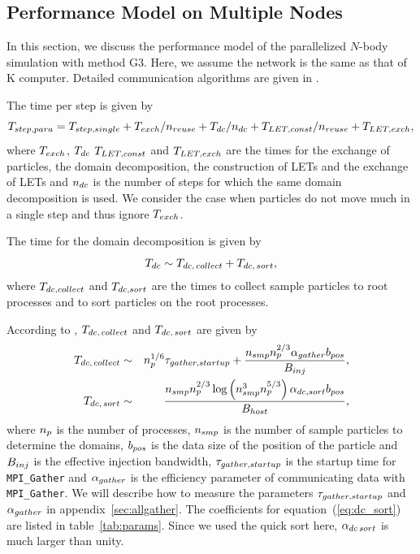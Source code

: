 \documentclass[dvipdfmx]{pasj01}
\begin{document}
\subsection{Performance Model on Multiple Nodes}
\label{sec:perf_model_para}

In this section, we discuss the performance model of the parallelized
$N$-body simulation with method G3. Here, we assume the network is the
same as that of K computer. Detailed communication algorithms are
given in \citet{Iwasawaetal2016}.

The time per step is given by
\begin{equation}
  T_{\rm step, para} = T_{\rm step, single} + T_{\rm exch}/n_{\rm reuse} + T_{\rm dc}/n_{\rm dc} + T_{\rm LET, const}/n_{\rm reuse} + T_{\rm LET, exch},
\end{equation}
where $T_{\rm exch}$, $T_{\rm dc}$ $T_{\rm LET, const}$ and $T_{\rm
  LET, exch}$ are the times for the exchange of particles, the domain
decomposition, the construction of LETs and the exchange of LETs and
$n_{\rm dc}$ is the number of steps for which the same domain
decomposition is used. We consider the case when particles do not move
much in a single step and thus ignore $T_{\rm exch}$.

The time for the domain decomposition is given by
\begin{equation}
  T_{\rm dc} \sim T_{\rm dc,\, collect} + T_{\rm dc,\, sort},
\end{equation}
where $T_{\rm dc, collect}$ and $T_{\rm dc, sort}$ are the times to
collect sample particles to root processes and to sort particles on
the root processes.

According to \citet{Iwasawaetal2016}, $T_{\rm dc,\, collect}$ and
$T_{\rm dc,\, sort}$ are given by
\begin{eqnarray}
    T_{\rm dc,\, collect} &\sim& n^{1/6}_{\rm p} \tau_{\rm gather, startup} + \frac{n_{\rm smp} n^{2/3}_{\rm p} \alpha_{\rm gather} b_{\rm pos}}{B_{\rm inj}}, \label{eq:dc_collect}  \\
  T_{\rm dc,\, sort} &\sim& \frac{n_{\rm smp} n^{2/3}_{\rm p} \log \left( n^3_{\rm smp} n^{5/3}_{\rm p} \right) \alpha_{\rm dc, sort} b_{\rm pos}}{B_{\rm host}}, \label{eq:dc_sort}
\end{eqnarray}
where $n_{\rm p}$ is the number of processes, $n_{\rm smp}$ is the
number of sample particles to determine the domains, $b_{\rm pos}$ is
the data size of the position of the particle and $B_{\rm inj}$ is the
effective injection bandwidth, $\tau_{\rm gather, startup}$ is the
startup time for {\tt MPI\_Gather} and $\alpha_{\rm gather}$ is the
efficiency parameter of communicating data with {\tt MPI\_Gather}. We
will describe how to measure the parameters $\tau_{\rm gather,
  startup}$ and $\alpha_{\rm gather}$ in
appendix~\ref{sec:allgather}. The coefficients for
equation~(\ref{eq:dc_sort}) are listed in
table~\ref{tab:params}. Since we used the quick sort here,
$\alpha_{\rm dc\, sort}$ is much larger than unity.
\end{document}
